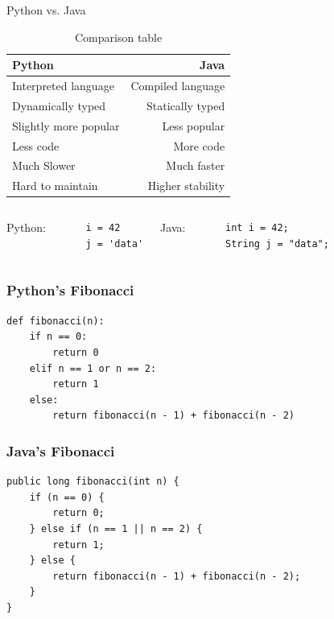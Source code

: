 \documentclass[aspectratio=169, 14pt]{beamer}
\begin{document}
\begin{frame}{Python vs. Java}
    \begin{table}
        \caption{Comparison table}
        \begin{tabular}{lr}
          \toprule
          Python & Java\\
          \midrule
          Interpreted language & Compiled language\\
          Dynamically typed & Statically typed\\
          Slightly more popular & Less popular\\
          Less code & More code\\
          Much Slower & Much faster \\
          Hard to maintain & Higher stability \\
          \bottomrule
        \end{tabular}
    \end{table}
\end{frame}

\begin{frame}[fragile]
    \begin{columns}
        Python:
\begin{verbatim}
    i = 42
    j = 'data'
\end{verbatim}
    
          Java:
\begin{verbatim}
    int i = 42;
    String j = "data";
\end{verbatim}
      \end{columns}
\end{frame}

\begin{frame}[fragile]
    \frametitle{Python's Fibonacci}
    \begin{verbatim}
def fibonacci(n):
    if n == 0:
        return 0
    elif n == 1 or n == 2:
        return 1
    else:
        return fibonacci(n - 1) + fibonacci(n - 2)        
    \end{verbatim}
\end{frame}

\begin{frame}[fragile]
    \frametitle{Java's Fibonacci}
    \begin{verbatim}
public long fibonacci(int n) {
    if (n == 0) {
        return 0;
    } else if (n == 1 || n == 2) {
        return 1;
    } else {
        return fibonacci(n - 1) + fibonacci(n - 2);
    }
}    
    \end{verbatim}
\end{frame}
\end{document}
